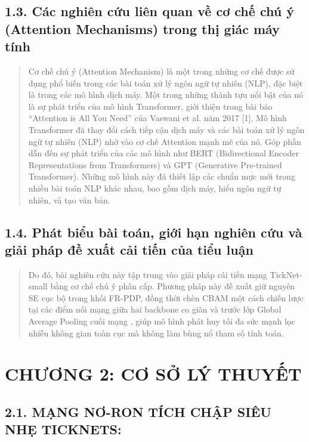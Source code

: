 \documentclass[
]{article}
\begin{document}
\subsection{1.3. Các nghiên cứu liên quan về cơ chế chú ý (Attention Mechanisms) trong thị giác máy tính}\label{ch1-3-attention}
\begin{quote}
Cơ chế chú ý (Attention Mechanism) là một trong những cơ chế được sử
dụng phổ biến trong các bài toán xử lý ngôn ngữ tự nhiên (NLP), đặc biệt
là trong các mô hình dịch máy. Một trong những thành tựu nổi bật của nó
là sự phát triển của mô hình Transformer, giới thiệu trong bài báo
``Attention is All You Need'' của Vaswani et al. năm 2017 {[}1{]}. Mô
hình Transformer đã thay đổi cách tiếp cận dịch máy và các bài toán xử
lý ngôn ngữ tự nhiên (NLP) nhờ vào cơ chế Attention mạnh mẽ của nó. Góp
phần dẫn đến sự phát triển của các mô hình như BERT (Bidirectional
Encoder Representations from Transformers) và GPT (Generative
Pre-trained Transformer). Những mô hình này đã thiết lập các chuẩn mực
mới trong nhiều bài toán NLP khác nhau, bao gồm dịch máy, hiểu ngôn ngữ
tự nhiên, và tạo văn bản.
\end{quote}

\subsection{1.4. Phát biểu bài toán, giới hạn nghiên cứu và giải pháp đề xuất cải tiến của tiểu luận}\label{ch1-4-problem}
\begin{quote}
Do đó, bài nghiên cứu này tập trung vào giải pháp cải tiến mạng
TickNet-small bằng cơ chế chú ý phân cấp. Phương pháp này đề xuất giữ
nguyên SE cục bộ trong khối FR-PDP, đồng thời chèn CBAM một cách chiến
lược tại các điểm nối mạng giữa hai backbone co giãn và trước lớp Global
Average Pooling cuối mạng , giúp mô hình phát huy tối đa sức mạnh lọc
nhiễu không gian toàn cục mà không làm bùng nổ tham số tính toán.
\end{quote}

\section{CHƯƠNG 2: CƠ SỞ LÝ THUYẾT}\label{chux1b0ux1a1ng-2}

\subsection{2.1. MẠNG NƠ-RON TÍCH CHẬP SIÊU NHẸ TICKNETS:}\label{2-1-ticknets}
\end{document}
